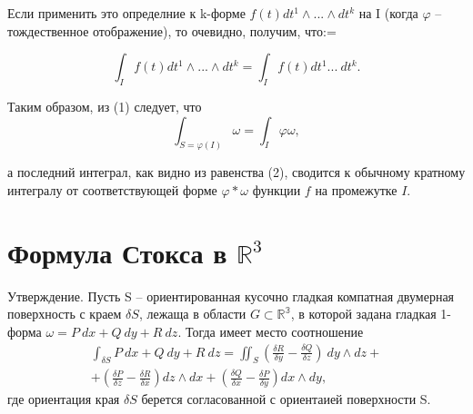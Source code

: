 \documentclass[a4paper, 12pt]{extarticle} %
\begin{document}
Если применить это определние к k-форме $f(t) dt^1 \land ...\land dt^k$ на I (когда $\varphi$ -- тождественное отображение), то очевидно, получим, что:=

\begin{equation}
    \int_I f(t) dt^1 \land ... \land dt^k = \int_I f(t) dt^1 ... \ dt^k.
\end{equation}

Таким образом, из (1) следует, что
\begin{equation*}
    \int_{S = \varphi(I)} \omega = \int_I \varphi \omega,
\end{equation*}

а последний интеграл, как видно из равенства (2), сводится к обычному кратному интегралу от соответствующей форме $\varphi * \omega$ функции $f$ на промежутке $I$.

\clearpage
\section*{Формула Стокса в $\mathbb{R}^3$}
Утверждение. Пусть S -- ориентированная кусочно гладкая компатная двумерная поверхность с краем $\delta S$, лежаща в области $G \subset \mathbb{R^3}$, в которой задана гладкая 1-форма $\omega = P\ dx + Q\ dy + R\ dz$. Тогда имеет место соотношение
\begin{eqnarray*}
    \int_{\delta S} P\ dx + Q\ dy + R\ dz = \iint_S \left( \frac{\delta R}{\delta y} - \frac{\delta Q}{\delta z} \right) \ dy \land dz + \\ + \left(\frac{\delta P}{\delta z} - \frac{\delta R}{\delta x}\right) dz \land dx + \left(\frac{\delta Q}{\delta x} - \frac{\delta P}{\delta y}\right) dx \land dy,
\end{eqnarray*}
где ориентация края $\delta S$ берется согласованной с ориентаией поверхности S.
\end{document}
